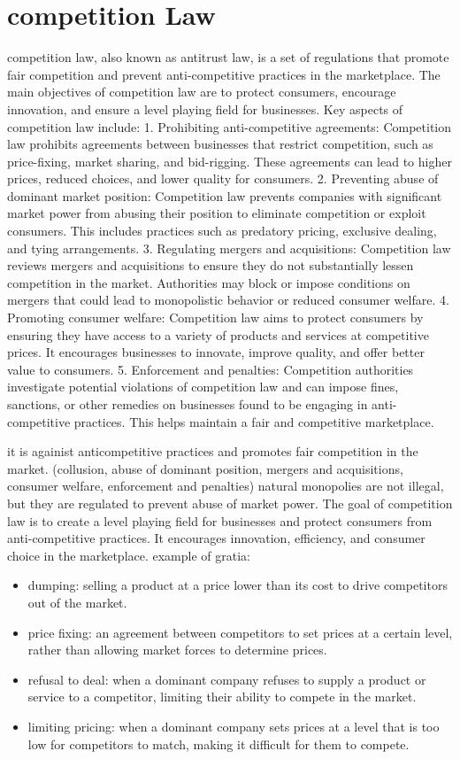 \documentclass[12pt,a4paper]{report}
\begin{document}
\chapter{competition Law}
competition law, also known as antitrust law, is a set of regulations that promote fair competition and prevent anti-competitive practices in the marketplace. The main objectives of competition law are to protect consumers, encourage innovation, and ensure a level playing field for businesses. Key aspects of competition law include:
1. Prohibiting anti-competitive agreements: Competition law prohibits agreements between businesses that restrict competition, such as price-fixing, market sharing, and bid-rigging. These agreements can lead to higher prices, reduced choices, and lower quality for consumers.
2. Preventing abuse of dominant market position: Competition law prevents companies with significant market power from abusing their position to eliminate competition or exploit consumers. This includes practices such as predatory pricing, exclusive dealing, and tying arrangements.
3. Regulating mergers and acquisitions: Competition law reviews mergers and acquisitions to ensure they do not substantially lessen competition in the market. Authorities may block or impose conditions on mergers that could lead to monopolistic behavior or reduced consumer welfare.
4. Promoting consumer welfare: Competition law aims to protect consumers by ensuring they have access to a variety of products and services at competitive prices. It encourages businesses to innovate, improve quality, and offer better value to consumers.
5. Enforcement and penalties: Competition authorities investigate potential violations of competition law and can impose fines, sanctions, or other remedies on businesses found to be engaging in anti-competitive practices. This helps maintain a fair and competitive marketplace.

it is againist anticompetitive practices and promotes fair competition in the market. (collusion, abuse of dominant position, mergers and acquisitions, consumer welfare, enforcement and penalties)
natural monopolies are not illegal, but they are regulated to prevent abuse of market power. The goal of competition law is to create a level playing field for businesses and protect consumers from anti-competitive practices. It encourages innovation, efficiency, and consumer choice in the marketplace.
example of gratia:
\begin{itemize}
    \item dumping: selling a product at a price lower than its cost to drive competitors out of the market.
    \item price fixing: an agreement between competitors to set prices at a certain level, rather than allowing market forces to determine prices.
    \item refusal to deal: when a dominant company refuses to supply a product or service to a competitor, limiting their ability to compete in the market.
    \item limiting pricing: when a dominant company sets prices at a level that is too low for competitors to match, making it difficult for them to compete.
\end{itemize}
\end{document}
